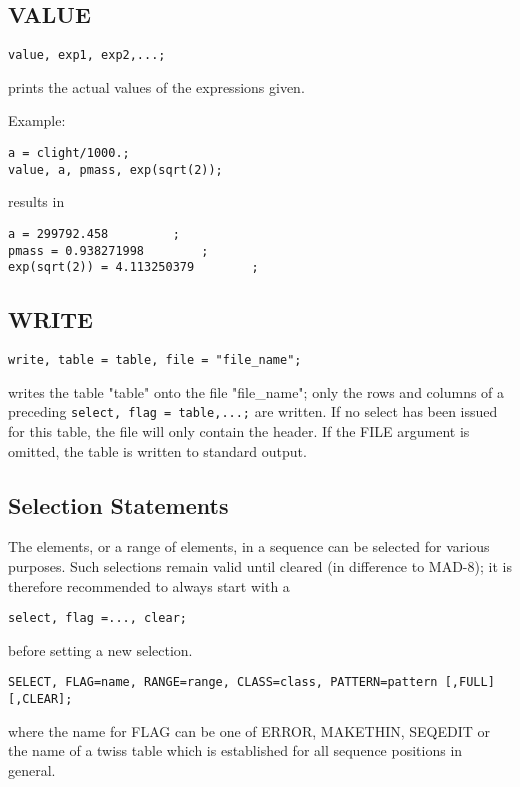 \subsection{VALUE}
\begin{verbatim}
value, exp1, exp2,...;
\end{verbatim} 
prints the actual values of the expressions given. 

Example: 
\begin{verbatim}
a = clight/1000.;
value, a, pmass, exp(sqrt(2));
\end{verbatim} 
results in 
\begin{verbatim}
a = 299792.458         ;
pmass = 0.938271998        ;
exp(sqrt(2)) = 4.113250379        ;
\end{verbatim}


\subsection{WRITE}
\label{subsec:general_write}
\begin{verbatim}
write, table = table, file = "file_name";
\end{verbatim} 
writes the table "table" onto the file "file\_name"; only the rows and
columns of a preceding \verb+select, flag = table,...;+ are written. If no select
has been issued for this table, the file will only contain the
header. If the FILE argument is omitted, the table is written to
standard output.  




%
\subsection{Selection Statements}
\label{subsec:selection}
The elements, or a range of elements, in a sequence can be selected for
various purposes. Such selections remain valid until cleared (in
difference to MAD-8); it is therefore recommended to always start with a  

\begin{verbatim}
select, flag =..., clear;
\end{verbatim} 
before setting a new selection. 
\begin{verbatim}
SELECT, FLAG=name, RANGE=range, CLASS=class, PATTERN=pattern [,FULL] [,CLEAR];
\end{verbatim} 
where the name for FLAG can be one of ERROR, MAKETHIN, SEQEDIT or the
name of a twiss table which is established for all sequence positions in
general.  

